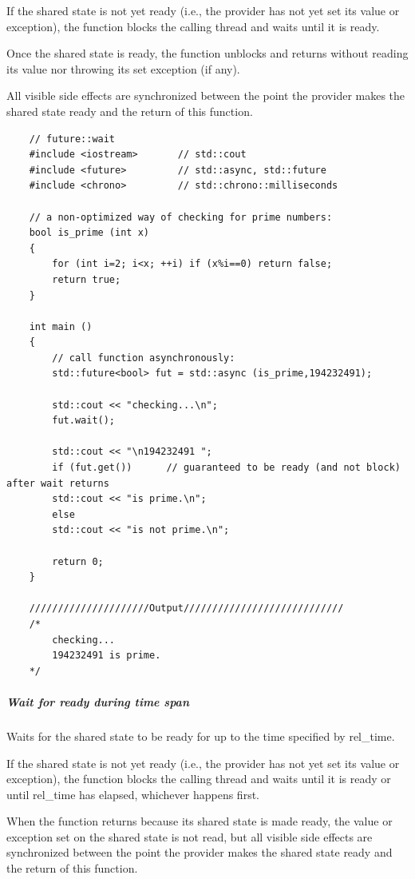 \documentclass[UTF8,a4paper,12pt]{ctexbook}
\begin{document}
			If the shared state is not yet ready (i.e., the provider has not yet set its value or exception), the function blocks the calling thread and waits until it is ready.
			
			Once the shared state is ready, the function unblocks and returns without reading its value nor throwing its set exception (if any).
			
			All visible side effects are synchronized between the point the provider makes the shared state ready and the return of this function.
\begin{lstlisting}
	// future::wait
	#include <iostream>       // std::cout
	#include <future>         // std::async, std::future
	#include <chrono>         // std::chrono::milliseconds
	
	// a non-optimized way of checking for prime numbers:
	bool is_prime (int x) 
	{
		for (int i=2; i<x; ++i) if (x%i==0) return false;
		return true;
	}
	
	int main ()
	{
		// call function asynchronously:
		std::future<bool> fut = std::async (is_prime,194232491); 
		
		std::cout << "checking...\n";
		fut.wait();
		
		std::cout << "\n194232491 ";
		if (fut.get())      // guaranteed to be ready (and not block) after wait returns
		std::cout << "is prime.\n";
		else
		std::cout << "is not prime.\n";
		
		return 0;
	}
	
	/////////////////////Output////////////////////////////
	/*
		checking...
		194232491 is prime.
	*/
\end{lstlisting}
			\subparagraph{Wait for ready during time span}Waits for the shared state to be ready for up to the time specified by rel\_time.
			
			If the shared state is not yet ready (i.e., the provider has not yet set its value or exception), the function blocks the calling thread and waits until it is ready or until rel\_time has elapsed, whichever happens first.
			
			When the function returns because its shared state is made ready, the value or exception set on the shared state is not read, but all visible side effects are synchronized between the point the provider makes the shared state ready and the return of this function.
			
\end{document}
